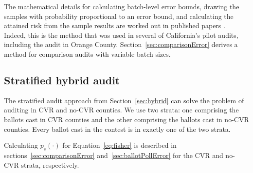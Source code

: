 \documentclass[runningheads]{llncs}
\begin{document}
%
%
%
%
The mathematical details for calculating
batch-level error bounds, drawing the samples with probability proportional to an
error bound, and calculating the attained risk from the sample results are worked out
in published papers \cite{stark09c,stark09b,stark10d}.
Indeed, this is the method that was used in several of California's pilot audits,
including the audit in Orange County.
Section~\ref{sec:comparisonError} derives a method for comparison audits with variable batch sizes.

\subsection{Stratified hybrid audit}
The stratified audit approach from Section~\ref{sec:hybrid} can solve the problem of auditing in CVR and no-CVR counties.
We use two strata: one comprising the ballots cast in CVR counties and the other comprising the ballots cast in
no-CVR counties. 
Every ballot cast in the contest is in exactly one of the two strata. 

Calculating $p_s(\cdot)$ for Equation~\ref{eq:fisher} is described in
sections~\ref{sec:comparisonError} and~\ref{sec:ballotPollError} for the CVR and no-CVR strata,
respectively.


%


\end{document}

